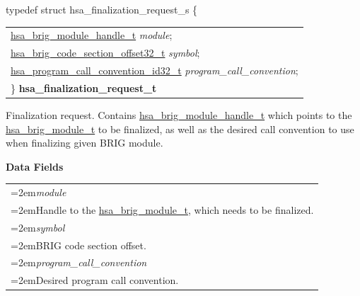 \documentclass[final]{book}
\newcommand{\reffld}[1]{\textit{#1}}
\begin{document}
\begin{appendices}
\noindent\begin{tcolorbox}[breakable,nobeforeafter,arc=0mm,colframe=white,colback=lightgray,left=0mm]
typedef struct  hsa_finalization_request_s \{
\vspace{-3.5mm}\begin{longtable}{@{}p{\textwidth}}
\hspace{1.7em}\hyperlink{group--FinalizerCoreApi-1gafaea8b9ab368c499b58375f02f4b178b}{hsa_brig_module_handle_t} \reffld{module};\\
\hspace{1.7em}\hyperlink{group--FinalizerCoreApi-1ga975ce5cee53438ed8dc078f3e1dfbc04}{hsa_brig_code_section_offset32_t} \reffld{symbol};\\
\hspace{1.7em}\hyperlink{group--FinalizerCoreApi-1ga8864426eb7d3278691632007c4eeebeb}{hsa_program_call_convention_id32_t} \reffld{program_call_convention};\\
\}  \hypertarget{group--FinalizerCoreApi-1gaf933a0a1175b6a9930f45a7d62e76fdb}{\textbf{hsa_finalization_request_t}}
\end{longtable}

\end{tcolorbox}
Finalization request. Contains \hyperlink{group--FinalizerCoreApi-1gafaea8b9ab368c499b58375f02f4b178b}{hsa_brig_module_handle_t} which points to the \hyperlink{group--FinalizerCoreApi-1ga2004b1fe311be9fbcb7ee5fb52d42a3b}{hsa_brig_module_t} to be finalized, as well as the desired call convention to use when finalizing given BRIG module.

\noindent\textbf{Data Fields}\\[-6mm]
\begin{longtable}{@{}>{\hangindent=2em}p{\textwidth}}
\reffld{module}\\\hspace{2em}Handle to the \hyperlink{group--FinalizerCoreApi-1ga2004b1fe311be9fbcb7ee5fb52d42a3b}{hsa_brig_module_t}, which needs to be finalized.\\[2mm]
\reffld{symbol}\\\hspace{2em}BRIG code section offset.\\[2mm]
\reffld{program_call_convention}\\\hspace{2em}Desired program call convention.
\end{longtable}




\end{appendices}
\end{document}
